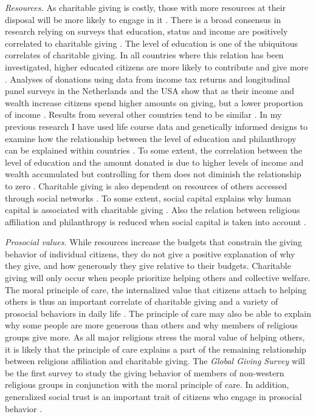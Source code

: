 \documentclass[twocolumn, serif, rga, numeric]{jote-article}
\begin{document}
\emph{Resources.} As charitable giving is costly, those with more resources at their disposal will be more likely to engage in it \cite{Wilson1997}. There is a broad consensus in research relying on surveys that education, status and income are positively correlated to charitable giving \cite{Bekkers2011d, Korndorfer2015, Wiepking2012}. The level of education is one of the ubiquitous correlates of charitable giving.
In all countries where this relation has been investigated, higher educated citizens are more likely to contribute and give more \cite{Bekkers2011d}. Analyses of donations using data from income tax returns and longitudinal panel surveys in the Netherlands and the USA show that as their income and wealth increase citizens spend higher amounts on giving, but a lower proportion of income \cite{Bekkers2009, Duffy2015}. Results from several other countries tend to be similar \cite{Wiepking2012}. In my previous research I have used life course data and genetically informed designs to examine how the relationship between the level of education and philanthropy can be explained within countries \cite{Bekkers2014, Bekkers2008a}. To some extent, the correlation between the level of education and the amount donated is due to higher levels of income and wealth accumulated \cite{Wiepking2009} but controlling for them does not diminish the relationship to zero \cite{Bekkers2011d}. Charitable giving is also dependent on resources of others accessed through social networks \cite{Wiepking2009, Glanville2016}. To some extent, social capital explains why human capital is associated with charitable giving \cite{Wiepking2009}. Also the relation between religious affiliation and philanthropy is reduced when social capital is taken into account \cite{Bekkers2008}.

\emph{Prosocial values.} While resources increase the budgets that constrain the giving behavior of individual citizens, they do not give a positive explanation of why they give, and how generously they give relative to their budgets. Charitable giving will only occur when people prioritize helping others and collective welfare. The moral principle of care, the internalized value that citizens attach to helping others \cite{Batson1994, Hoffman2000} is thus an important correlate of charitable giving and a variety of prosocial behaviors in daily life \cite{Wilhelm2010}. The principle of care may also be able to explain why some people are more generous than others and why members of religious groups give more. As all major religions stress the moral value of helping others, it is likely that the principle of care explains a part of the remaining relationship between religious affiliation and charitable giving. The \emph{Global Giving Survey} will be the first survey to study the giving behavior of members of non-western religious groups in conjunction with the moral principle of care. In addition, generalized social trust is an important trait of citizens who engage in prosocial behavior \cite{Bekkers2003, Uslaner2010}.
\end{document}
